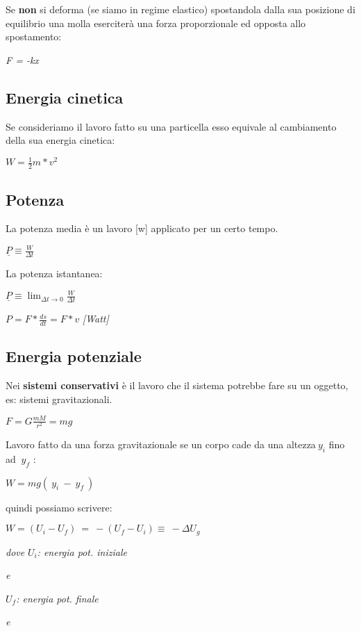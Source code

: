 Se \textbf{non} si deforma (se siamo in regime elastico) spostandola
dalla sua posizione di equilibrio una molla eserciterà una forza
proporzionale ed opposta allo spostamento:

\emph{F = -kx}

\subsection{Energia cinetica}\label{energia-cinetica}

Se consideriamo il lavoro fatto su una particella esso equivale al
cambiamento della sua energia cinetica:

\(W = \frac{1}{2}m*v^{2}\)

\subsection{Potenza}\label{potenza}

La potenza media è un lavoro {[}w{]} applicato per un certo tempo.

\(\underline{P} \equiv \frac{W}{\Delta t}\)

La potenza istantanea:

\(\underline{P} \equiv \lim_{\Delta t \rightarrow 0}\frac{W}{\Delta t}\)

\(P = F*\frac{ds}{dt} = F*v\) \emph{{[}Watt{]}}

\subsection{Energia potenziale}\label{energia-potenziale}

Nei \textbf{sistemi conservativi} è il lavoro che il sistema potrebbe
fare su un oggetto, es: sistemi gravitazionali.

\(F = G\frac{mM}{r^{2}} = mg\)

Lavoro fatto da una forza gravitazionale se un corpo cade da una
altezza\(\ y_{i}\) fino ad \(\ y_{f}\) :

\(W = mg(\ y_{i}\  - \ y_{f}\ )\)

quindi possiamo scrivere:

\(W = (U_{i} - U_{f})\  = \  - (U_{f} - U_{i}) \equiv \  - \Delta U_{g}\)

\emph{dove} \(U_{i}\)\emph{: energia pot. iniziale}

\emph{e}

\(U_{f}\)\emph{: energia pot. finale}

\emph{e}

